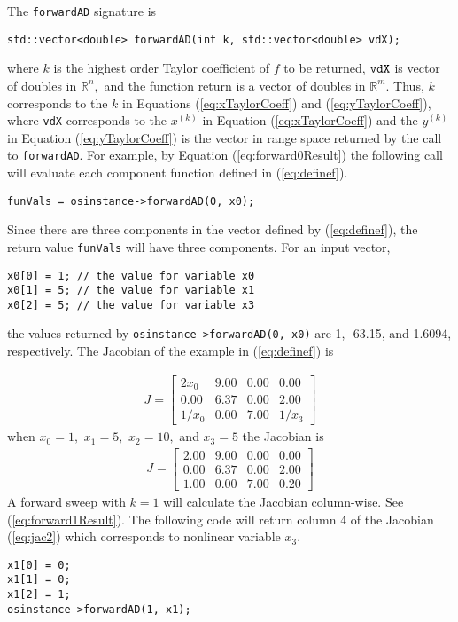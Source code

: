\documentclass[11pt]{article}
\renewcommand{\_}{{\char"5F}}
\renewcommand{\{}{{\char"7B}}
\renewcommand{\}}{{\char"7D}}
\renewcommand{\^}{{\char"0D}}
\renewcommand{\'}{{\char"0D}}
\begin{document}
The {\tt forwardAD} signature is
\begin{verbatim}
std::vector<double> forwardAD(int k, std::vector<double> vdX);
\end{verbatim}
where $k$ is the highest order Taylor coefficient of $f$ to be returned,  $\tt vdX$ is vector of doubles in $ \mathbb{R}^{n},$ and the function return is a vector of doubles in $ \mathbb{R}^{m}.$  Thus, $k$ corresponds to the $k$ in Equations  (\ref{eq:xTaylorCoeff}) and (\ref{eq:yTaylorCoeff}),  where {\tt vdX} corresponds to the $x^{(k)}$ in Equation (\ref{eq:xTaylorCoeff}) and the $y^{(k)}$ in Equation (\ref{eq:yTaylorCoeff}) is the vector in range space returned by the call to {\tt  forwardAD}.    For example, by  Equation (\ref{eq:forward0Result}) the following call will evaluate each component function defined in (\ref{eq:definef}).
\begin{verbatim}
funVals = osinstance->forwardAD(0, x0);
\end{verbatim}
Since there are three components in the vector defined by  (\ref{eq:definef}), the return value  {\tt funVals} will have three components. For an input vector,
\begin{verbatim}
x0[0] = 1; // the value for variable x0
x0[1] = 5; // the value for variable x1
x0[2] = 5; // the value for variable x3
\end{verbatim}
the values returned by {\tt osinstance->forwardAD(0, x0)}  are 1, -63.15, and 1.6094, respectively.
The Jacobian of the example in (\ref{eq:definef}) is

\begin{eqnarray}
J =
\left[
\begin{array}{rrrr}
2x_{0} &9.00&0.00&0.00   \\
0.00&6.37&0.00&2.00 \\
1/x_{0}&0.00&7.00&1/x_{3}
\end{array}
\right] \label{eq:jac}
\end{eqnarray}
when $x_{0} = 1,$ $x_{1} = 5,$ $x_{2} = 10,$ and $x_{3} = 5$ the Jacobian is
\begin{eqnarray}
J =
\left[
\begin{array}{rrrr}
2.00 &9.00&0.00&0.00   \\
0.00&6.37&0.00&2.00 \\
1.00&0.00&7.00&0.20
\end{array}
\right] \label{eq:jac2}
\end{eqnarray}
A forward sweep with $k = 1$ will calculate the Jacobian column-wise.  See
(\ref{eq:forward1Result}).  The following code will return column 4 of the Jacobian (\ref{eq:jac2}) which corresponds to nonlinear variable $x_{3}.$
\begin{verbatim}
x1[0] = 0;
x1[1] = 0;
x1[2] = 1;
osinstance->forwardAD(1, x1);
\end{verbatim}
\end{document}
